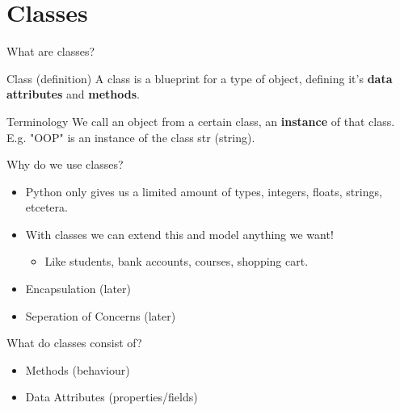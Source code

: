 \section{Classes}

\begin{frame}{What are classes?}
\pause
\begin{block}{Class (definition)}
    A class is a blueprint for a type of object, defining it's \textbf{data attributes} and \textbf{methods}.
\end{block}
\pause
\begin{alertblock}{Terminology}
    We call an object from a certain class, an \textbf{instance} of that class. E.g. "OOP" is an instance of the class str (string).
\end{alertblock}
\end{frame}

\begin{frame}{Why do we use classes?}
    \pause
    \begin{itemize}
        \pause
        \item Python only gives us a limited amount of types, integers, floats, strings, etcetera. 
        \pause
        \item With classes we can extend this and model anything we want!
        \pause
        \begin{itemize}
            \item Like students, bank accounts, courses, shopping cart.
        \end{itemize}
        \pause
        \item Encapsulation (later)
        \pause
        \item Seperation of Concerns (later)
    \end{itemize}
\end{frame}

\begin{frame}{What do classes consist of?}
    \begin{itemize}
        \pause
        \item Methods (behaviour)
        \pause
        \item Data Attributes (properties/fields)
    \end{itemize}
\end{frame}

